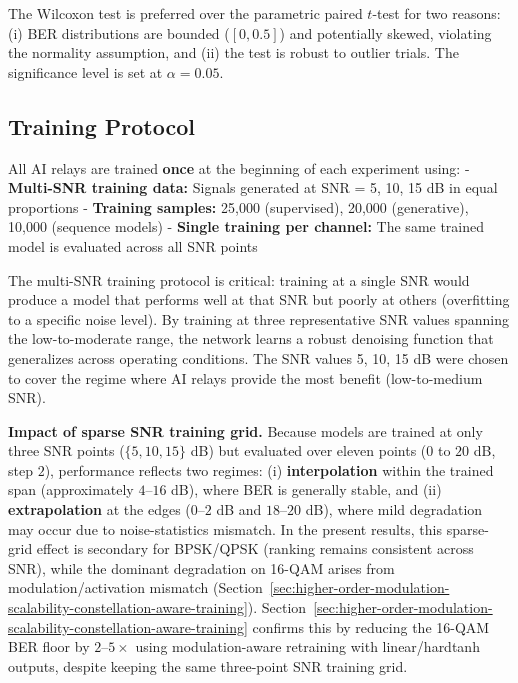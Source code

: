 The Wilcoxon test is preferred over the parametric paired \(t\)-test for two reasons: (i) BER distributions are bounded (\([0, 0.5]\)) and potentially skewed, violating the normality assumption, and (ii) the test is robust to outlier trials. The significance level is set at \(\alpha = 0.05\).

\subsection{Training Protocol}\label{sec:training-protocol}

All AI relays are trained \textbf{once} at the beginning of each experiment using: - \textbf{Multi-SNR training data:} Signals generated at SNR = 5, 10, 15 dB in equal proportions - \textbf{Training samples:} 25,000 (supervised), 20,000 (generative), 10,000 (sequence models) - \textbf{Single training per channel:} The same trained model is evaluated across all SNR points

The multi-SNR training protocol is critical: training at a single SNR would produce a model that performs well at that SNR but poorly at others (overfitting to a specific noise level). By training at three representative SNR values spanning the low-to-moderate range, the network learns a robust denoising function that generalizes across operating conditions. The SNR values 5, 10, 15 dB were chosen to cover the regime where AI relays provide the most benefit (low-to-medium SNR).

\textbf{Impact of sparse SNR training grid.} Because models are trained at only three SNR points (\(\{5,10,15\}\) dB) but evaluated over eleven points (\(0\) to \(20\) dB, step \(2\)), performance reflects two regimes: (i) \textbf{interpolation} within the trained span (approximately \(4\)--\(16\) dB), where BER is generally stable, and (ii) \textbf{extrapolation} at the edges (\(0\)--\(2\) dB and \(18\)--\(20\) dB), where mild degradation may occur due to noise-statistics mismatch. In the present results, this sparse-grid effect is secondary for BPSK/QPSK (ranking remains consistent across SNR), while the dominant degradation on 16-QAM arises from modulation/activation mismatch (Section~\ref{sec:higher-order-modulation-scalability-constellation-aware-training}). Section~\ref{sec:higher-order-modulation-scalability-constellation-aware-training} confirms this by reducing the 16-QAM BER floor by \(2\)--\(5\times\) using modulation-aware retraining with linear/hardtanh outputs, despite keeping the same three-point SNR training grid.

